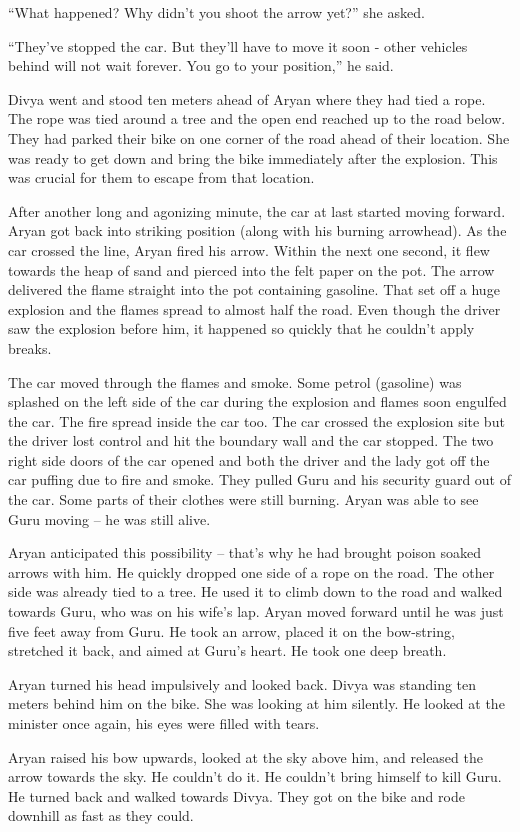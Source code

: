 “What happened? Why didn't you shoot the arrow yet?” she asked.

“They've stopped the car. But they'll have to move it soon - other vehicles
behind will not wait forever. You go to your position,” he said.

Divya went and stood ten meters ahead of Aryan where they had tied a rope. The
rope was tied around a tree and the open end reached up to the road below. They
had parked their bike on one corner of the road ahead of their location. She was
ready to get down and bring the bike immediately after the explosion. This was
crucial for them to escape from that location.

After another long and agonizing minute, the car at last started moving forward.
Aryan got back into striking position (along with his burning arrowhead). As the
car crossed the line, Aryan fired his arrow. Within the next one second, it flew
towards the heap of sand and pierced into the felt paper on the pot. The arrow
delivered the flame straight into the pot containing gasoline. That set off a
huge explosion and the flames spread to almost half the road. Even though the
driver saw the explosion before him, it happened so quickly that he couldn't
apply breaks.

The car moved through the flames and smoke. Some petrol (gasoline) was splashed
on the left side of the car during the explosion and flames soon engulfed the
car. The fire spread inside the car too. The car crossed the explosion site but
the driver lost control and hit the boundary wall and the car stopped. The two
right side doors of the car opened and both the driver and the lady got off the
car puffing due to fire and smoke. They pulled Guru and his security guard out
of the car. Some parts of their clothes were still burning. Aryan was able to
see Guru moving – he was still alive.

Aryan anticipated this possibility – that's why he had brought poison soaked
arrows with him. He quickly dropped one side of a rope on the road. The other
side was already tied to a tree. He used it to climb down to the road and walked
towards Guru, who was on his wife's lap. Aryan moved forward until he was just
five feet away from Guru. He took an arrow, placed it on the bow-string,
stretched it back, and aimed at Guru's heart. He took one deep breath.

Aryan turned his head impulsively and looked back. Divya was standing ten meters
behind him on the bike. She was looking at him silently. He looked at the
minister once again, his eyes were filled with tears.

Aryan raised his bow upwards, looked at the sky above him, and released the
arrow towards the sky. He couldn't do it. He couldn't bring himself to kill
Guru. He turned back and walked towards Divya. They got on the bike and rode
downhill as fast as they could.